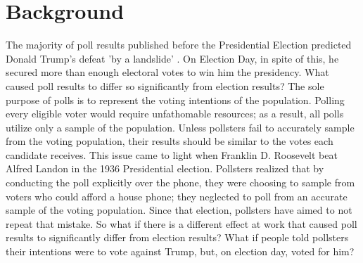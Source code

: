 
\section{Background}

The majority of poll results published before the Presidential Election
predicted Donald Trump's defeat 'by a landslide' \citep{pomarico_nate_2016}.
On Election Day, in spite of this, he secured more than enough electoral votes
to win him the presidency. What caused poll results to differ so significantly
from election results? The sole purpose of polls is to represent the voting
intentions of the population. Polling every eligible voter would require
unfathomable resources; as a result, all polls utilize only a sample of the
population. Unless pollsters fail to accurately sample from the voting
population, their results should be similar to the votes each candidate
receives. This issue came to light when Franklin D. Roosevelt beat Alfred
Landon in the 1936 Presidential election. Pollsters realized that by
conducting the poll explicitly over the phone, they were choosing to sample
from voters who could afford a house phone; they neglected to poll from an
accurate sample of the voting population. Since that election, pollsters have
aimed to not repeat that mistake. So what if there is a different effect at
work that caused poll results to significantly differ from election results?
What if people told pollsters their intentions were to vote against Trump,
but, on election day, voted for him?

